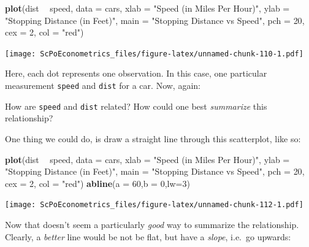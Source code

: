 \documentclass[]{book}
\newenvironment{Shaded}{\begin{snugshade}}{\end{snugshade}}
\newcommand{\KeywordTok}[1]{\textcolor[rgb]{0.13,0.29,0.53}{\textbf{#1}}}
\newcommand{\DataTypeTok}[1]{\textcolor[rgb]{0.13,0.29,0.53}{#1}}
\newcommand{\DecValTok}[1]{\textcolor[rgb]{0.00,0.00,0.81}{#1}}
\newcommand{\StringTok}[1]{\textcolor[rgb]{0.31,0.60,0.02}{#1}}
\newcommand{\OperatorTok}[1]{\textcolor[rgb]{0.81,0.36,0.00}{\textbf{#1}}}
\newcommand{\NormalTok}[1]{#1}
\newenvironment{note}{\begin{tcolorbox}[colback=blue!5!white,colframe=blue!75!black,title=\textbf{Note:}]}{\end{tcolorbox}}
\theoremstyle{definition}
\theoremstyle{definition}
\theoremstyle{definition}
\theoremstyle{remark}
\begin{document}
\begin{Shaded}
\begin{Highlighting}[]
\KeywordTok{plot}\NormalTok{(dist }\OperatorTok{~}\StringTok{ }\NormalTok{speed, }\DataTypeTok{data =}\NormalTok{ cars,}
     \DataTypeTok{xlab =} \StringTok{"Speed (in Miles Per Hour)"}\NormalTok{,}
     \DataTypeTok{ylab =} \StringTok{"Stopping Distance (in Feet)"}\NormalTok{,}
     \DataTypeTok{main =} \StringTok{"Stopping Distance vs Speed"}\NormalTok{,}
     \DataTypeTok{pch  =} \DecValTok{20}\NormalTok{,}
     \DataTypeTok{cex  =} \DecValTok{2}\NormalTok{,}
     \DataTypeTok{col  =} \StringTok{"red"}\NormalTok{)}
\end{Highlighting}
\end{Shaded}

\texttt{[image: ScPoEconometrics\_files/figure-latex/unnamed-chunk-110-1.pdf]}

Here, each dot represents one observation. In this case, one particular
measurement \texttt{speed} and \texttt{dist} for a car. Now, again:

\begin{note}
How are \texttt{speed} and \texttt{dist} related? How could one best
\emph{summarize} this relationship?
\end{note}

 One thing we could do, is draw a straight line through this
scatterplot, like so:

\begin{Shaded}
\begin{Highlighting}[]
\KeywordTok{plot}\NormalTok{(dist }\OperatorTok{~}\StringTok{ }\NormalTok{speed, }\DataTypeTok{data =}\NormalTok{ cars,}
     \DataTypeTok{xlab =} \StringTok{"Speed (in Miles Per Hour)"}\NormalTok{,}
     \DataTypeTok{ylab =} \StringTok{"Stopping Distance (in Feet)"}\NormalTok{,}
     \DataTypeTok{main =} \StringTok{"Stopping Distance vs Speed"}\NormalTok{,}
     \DataTypeTok{pch  =} \DecValTok{20}\NormalTok{,}
     \DataTypeTok{cex  =} \DecValTok{2}\NormalTok{,}
     \DataTypeTok{col  =} \StringTok{"red"}\NormalTok{)}
\KeywordTok{abline}\NormalTok{(}\DataTypeTok{a =} \DecValTok{60}\NormalTok{,}\DataTypeTok{b =} \DecValTok{0}\NormalTok{,}\DataTypeTok{lw=}\DecValTok{3}\NormalTok{)}
\end{Highlighting}
\end{Shaded}

\texttt{[image: ScPoEconometrics\_files/figure-latex/unnamed-chunk-112-1.pdf]}

Now that doesn't seem a particularly \emph{good} way to summarize the
relationship. Clearly, a \emph{better} line would be not be flat, but
have a \emph{slope}, i.e.~go upwards:
\end{document}
